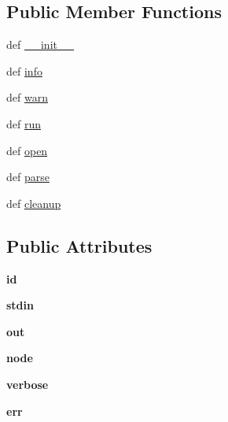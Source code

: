 \subsection*{Public Member Functions}
\begin{DoxyCompactItemize}
\item 
def \hyperlink{classospfmanetmdrtest_1_1_cmd_ab02c7cf620600e31b76f667fd420f317}{\+\_\+\+\_\+init\+\_\+\+\_\+}
\item 
def \hyperlink{classospfmanetmdrtest_1_1_cmd_a5506910c4ded480c95053a9c633ae79d}{info}
\item 
def \hyperlink{classospfmanetmdrtest_1_1_cmd_a413e3dbfe7c5508f069ff4f06ce3d51f}{warn}
\item 
def \hyperlink{classospfmanetmdrtest_1_1_cmd_ac598d665a861a9ec683f1965bbb91d03}{run}
\item 
def \hyperlink{classospfmanetmdrtest_1_1_cmd_ac5fa80184c4322ab00b294eafa593b25}{open}
\item 
def \hyperlink{classospfmanetmdrtest_1_1_cmd_aa17319b4967ea4eba32a70a6afbe38d3}{parse}
\item 
def \hyperlink{classospfmanetmdrtest_1_1_cmd_ad6618fcdebb8d6da31267082ad2e65bc}{cleanup}
\end{DoxyCompactItemize}
\subsection*{Public Attributes}
\begin{DoxyCompactItemize}
\item 
\hypertarget{classospfmanetmdrtest_1_1_cmd_a8e8dc7a079c3aba53fb551ce873b62ba}{{\bfseries id}}\label{classospfmanetmdrtest_1_1_cmd_a8e8dc7a079c3aba53fb551ce873b62ba}

\item 
\hypertarget{classospfmanetmdrtest_1_1_cmd_a9c6143f1aec039c58db94d916f2af939}{{\bfseries stdin}}\label{classospfmanetmdrtest_1_1_cmd_a9c6143f1aec039c58db94d916f2af939}

\item 
\hypertarget{classospfmanetmdrtest_1_1_cmd_a33a089b0504e3732504d0576180daa75}{{\bfseries out}}\label{classospfmanetmdrtest_1_1_cmd_a33a089b0504e3732504d0576180daa75}

\item 
\hypertarget{classospfmanetmdrtest_1_1_cmd_afed2fa10c1050eb92be08715423ebb78}{{\bfseries node}}\label{classospfmanetmdrtest_1_1_cmd_afed2fa10c1050eb92be08715423ebb78}

\item 
\hypertarget{classospfmanetmdrtest_1_1_cmd_ae89258a5b47a0c9e8f8fd3f01c82500a}{{\bfseries verbose}}\label{classospfmanetmdrtest_1_1_cmd_ae89258a5b47a0c9e8f8fd3f01c82500a}

\item 
\hypertarget{classospfmanetmdrtest_1_1_cmd_a44555b79a7cd44558de31cb121cf913e}{{\bfseries err}}\label{classospfmanetmdrtest_1_1_cmd_a44555b79a7cd44558de31cb121cf913e}

\end{DoxyCompactItemize}
